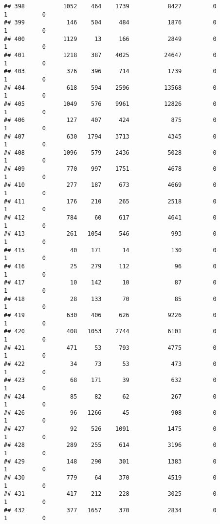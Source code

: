 \documentclass[
]{article}
\begin{document}
\begin{verbatim}
## 398           1052    464    1739           8427         0         1          0
## 399            146    504     484           1876         0         1          0
## 400           1129     13     166           2849         0         1          0
## 401           1218    387    4025          24647         0         1          0
## 403            376    396     714           1739         0         1          0
## 404            618    594    2596          13568         0         1          0
## 405           1049    576    9961          12826         0         1          0
## 406            127    407     424            875         0         1          0
## 407            630   1794    3713           4345         0         1          0
## 408           1096    579    2436           5028         0         1          0
## 409            770    997    1751           4678         0         1          0
## 410            277    187     673           4669         0         1          0
## 411            176    210     265           2518         0         1          0
## 412            784     60     617           4641         0         1          0
## 413            261   1054     546            993         0         1          0
## 415             40    171      14            130         0         1          0
## 416             25    279     112             96         0         1          0
## 417             10    142      10             87         0         1          0
## 418             28    133      70             85         0         1          0
## 419            630    406     626           9226         0         1          0
## 420            408   1053    2744           6101         0         1          0
## 421            471     53     793           4775         0         1          0
## 422             34     73      53            473         0         1          0
## 423             68    171      39            632         0         1          0
## 424             85     82      62            267         0         1          0
## 426             96   1266      45            908         0         1          0
## 427             92    526    1091           1475         0         1          0
## 428            289    255     614           3196         0         1          0
## 429            148    290     301           1383         0         1          0
## 430            779     64     370           4519         0         1          0
## 431            417    212     228           3025         0         1          0
## 432            377   1657     370           2834         0         1          0

\end{verbatim}
\end{document}
